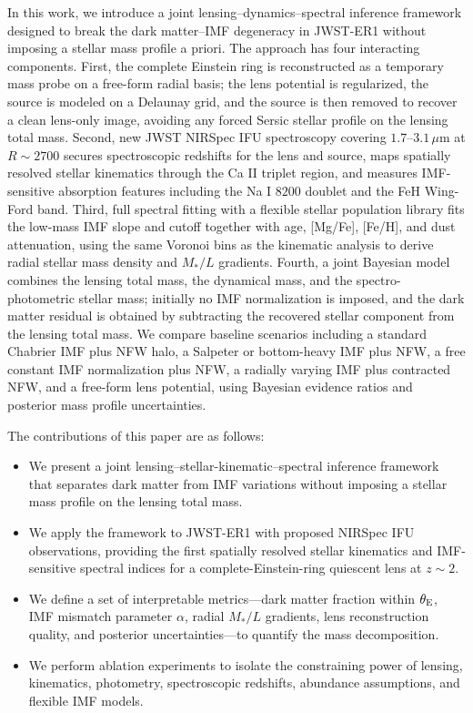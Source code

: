 \documentclass{article}
\begin{document}
In this work, we introduce a joint lensing--dynamics--spectral inference framework designed to break the dark matter--IMF degeneracy in JWST-ER1 without imposing a stellar mass profile a priori. The approach has four interacting components. First, the complete Einstein ring is reconstructed as a temporary mass probe on a free-form radial basis; the lens potential is regularized, the source is modeled on a Delaunay grid, and the source is then removed to recover a clean lens-only image, avoiding any forced Sersic stellar profile on the lensing total mass. Second, new JWST NIRSpec IFU spectroscopy covering $1.7$--$3.1\,\mu\mathrm{m}$ at $R\sim2700$ secures spectroscopic redshifts for the lens and source, maps spatially resolved stellar kinematics through the Ca II triplet region, and measures IMF-sensitive absorption features including the Na I $8200$ doublet and the FeH Wing-Ford band. Third, full spectral fitting with a flexible stellar population library fits the low-mass IMF slope and cutoff together with age, [Mg/Fe], [Fe/H], and dust attenuation, using the same Voronoi bins as the kinematic analysis to derive radial stellar mass density and $M_\ast/L$ gradients. Fourth, a joint Bayesian model combines the lensing total mass, the dynamical mass, and the spectro-photometric stellar mass; initially no IMF normalization is imposed, and the dark matter residual is obtained by subtracting the recovered stellar component from the lensing total mass. We compare baseline scenarios including a standard Chabrier IMF plus NFW halo, a Salpeter or bottom-heavy IMF plus NFW, a free constant IMF normalization plus NFW, a radially varying IMF plus contracted NFW, and a free-form lens potential, using Bayesian evidence ratios and posterior mass profile uncertainties.

The contributions of this paper are as follows:
\begin{itemize}
    \item We present a joint lensing--stellar-kinematic--spectral inference framework that separates dark matter from IMF variations without imposing a stellar mass profile on the lensing total mass.
    \item We apply the framework to JWST-ER1 with proposed NIRSpec IFU observations, providing the first spatially resolved stellar kinematics and IMF-sensitive spectral indices for a complete-Einstein-ring quiescent lens at $z\sim2$.
    \item We define a set of interpretable metrics---dark matter fraction within $\theta_{\rm E}$, IMF mismatch parameter $\alpha$, radial $M_\ast/L$ gradients, lens reconstruction quality, and posterior uncertainties---to quantify the mass decomposition.
    \item We perform ablation experiments to isolate the constraining power of lensing, kinematics, photometry, spectroscopic redshifts, abundance assumptions, and flexible IMF models.
\end{itemize}
\end{document}
